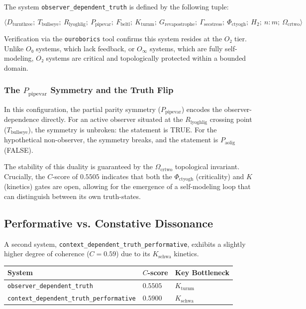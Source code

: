 \documentclass[12pt,a4paper]{article}
\begin{document}
The system \texttt{observer\_dependent\_truth} is defined by the following tuple:


\[\langle D_{\text{turnthree}};\ T_{\text{bullseye}};\ R_{\text{lyoghlig}};\ P_{\text{pipevar}};\ F_{\text{beltl}};\ K_{\text{turnm}};\ G_{\text{revapostrophe}};\ \Gamma_{\text{secstress}};\ \Phi_{\text{ctyogh}};\ H_2;\ n{:}m;\ \Omega_{\text{crtwo}} \rangle\]

Verification via the \texttt{ouroborics} tool confirms this system resides at the $O₂$ tier. Unlike $O₀$ systems, which lack feedback, or $O_{\infty}$ systems, which are fully self-modeling, $O₂$ systems are critical and topologically protected within a bounded domain.

\subsubsection{The $P_{\text{pipevar}}$ Symmetry and the Truth Flip}

In this configuration, the partial parity symmetry ($P_{\text{pipevar}}$) encodes the observer-dependence directly. For an active observer situated at the $R_{\text{lyoghlig}}$ crossing point ($T_{\text{bullseye}}$), the symmetry is unbroken: the statement is TRUE. For the hypothetical non-observer, the symmetry breaks, and the statement is $P_{\text{aolig}}$ (FALSE).

The stability of this duality is guaranteed by the $\Omega_{\text{crtwo}}$ topological invariant. Crucially, the $C$-score of $0.5505$ indicates that both the $\Phi_{\text{ctyogh}}$ (criticality) and $K$ (kinetics) gates are open, allowing for the emergence of a self-modeling loop that can distinguish between its own truth-states.

\subsection{Performative vs. Constative Dissonance}

A second system, \texttt{context\_dependent\_truth\_performative}, exhibits a slightly higher degree of coherence ($C = 0.59$) due to its $K_{\text{schwa}}$ kinetics.

\begin{table}[htbp]
\centering
\small
{}
\begin{tabularx}{\textwidth}{>{\centering\arraybackslash}X >{\centering\arraybackslash}X >{\centering\arraybackslash}X}
\toprule
\rowcolor{gray!25}\textbf{System} & \textbf{$C$-score} & \textbf{Key Bottleneck} \\
\midrule
\rowcolors{1}{white}{gray!10}
\texttt{observer\_dependent\_truth} & $0.5505$ & $K_{\text{turnm}}$ \\
\texttt{context\_dependent\_truth\_performative} & $0.5900$ & $K_{\text{schwa}}$ \\
\bottomrule
\end{tabularx}
\end{table}
\end{document}

